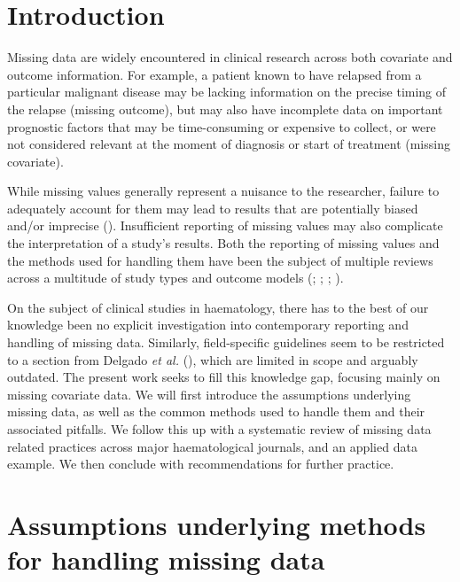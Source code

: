 \documentclass[
  letterpaper,
  paper=240mm:170mm,
  twoside=true,
  open=right,
  fontsize=10pt,
  pagesize=false,
  BCOR=15mm,
  DIV=14,
  headinclude=true,
  footinclude=false,
  headsepline=on]{scrbook}
\begin{document}
\clearpage

\section{Introduction}\label{introduction}

Missing data are widely encountered in clinical research across both
covariate and outcome information. For example, a patient known to have
relapsed from a particular malignant disease may be lacking information
on the precise timing of the relapse (missing outcome), but may also
have incomplete data on important prognostic factors that may be
time-consuming or expensive to collect, or were not considered relevant
at the moment of diagnosis or start of treatment (missing covariate).

While missing values generally represent a nuisance to the researcher,
failure to adequately account for them may lead to results that are
potentially biased and/or imprecise
(). Insufficient reporting of missing values may also
complicate the interpretation of a study's results. Both the reporting
of missing values and the methods used for handling them have been the
subject of multiple reviews across a multitude of study types and
outcome models (; ; ; ).

On the subject of clinical studies in haematology, there has to the best
of our knowledge been no explicit investigation into contemporary
reporting and handling of missing data. Similarly, field-specific
guidelines seem to be restricted to a section from Delgado \emph{et al.}
(), which are
limited in scope and arguably outdated. The present work seeks to fill
this knowledge gap, focusing mainly on missing covariate data. We will
first introduce the assumptions underlying missing data, as well as the
common methods used to handle them and their associated pitfalls. We
follow this up with a systematic review of missing data related
practices across major haematological journals, and an applied data
example. We then conclude with recommendations for further practice.

\section{Assumptions underlying methods for handling missing
data}\label{assumptions-underlying-methods-for-handling-missing-data}
\end{document}
